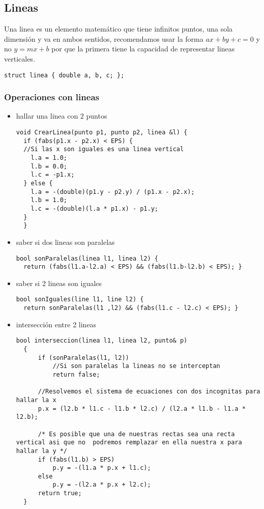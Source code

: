 \subsection{Lineas}
Una linea es un elemento matemático que tiene infinitos puntos, una sola dimensión y va en ambos sentidos, recomendamos usar
la forma $ax+by+c=0$ y no $y=mx+b$ por que la primera tiene la capacidad de representar lineas verticales.
\begin{lstlisting}[style=C]
struct linea { double a, b, c; };
\end{lstlisting}
\subsubsection{Operaciones con lineas}
\begin{itemize}
  \item hallar una linea con 2 puntos
  \\
  \begin{lstlisting}[style=C]
  void CrearLinea(punto p1, punto p2, linea &l) {
  if (fabs(p1.x - p2.x) < EPS) {
  //Si las x son iguales es una linea vertical
    l.a = 1.0;
    l.b = 0.0;
    l.c = -p1.x;
  } else {
    l.a = -(double)(p1.y - p2.y) / (p1.x - p2.x);
    l.b = 1.0;
    l.c = -(double)(l.a * p1.x) - p1.y;
  }
  }
  \end{lstlisting}
  \item saber si dos lineas son paralelas
  \\
  \begin{lstlisting}[style=C]
  bool sonParalelas(linea l1, linea l2) {
  return (fabs(l1.a-l2.a) < EPS) && (fabs(l1.b-l2.b) < EPS); }
  \end{lstlisting}
  \item saber si 2 lineas son iguales
  \\
  \begin{lstlisting}[style=C]
  bool sonIguales(line l1, line l2) {
  return sonParalelas(l1 ,l2) && (fabs(l1.c - l2.c) < EPS); }
  \end{lstlisting}
  \item intersección entre 2 lineas
  \\
  \begin{lstlisting}[style=C]
  bool interseccion(linea l1, linea l2, punto& p)
  {
      if (sonParalelas(l1, l2))
          //Si son paralelas la lineas no se interceptan
          return false;

      //Resolvemos el sistema de ecuaciones con dos incognitas para hallar la x
      p.x = (l2.b * l1.c - l1.b * l2.c) / (l2.a * l1.b - l1.a * l2.b);

      /* Es posible que una de nuestras rectas sea una recta vertical asi que no  podremos remplazar en ella nuestra x para hallar la y */
      if (fabs(l1.b) > EPS)
          p.y = -(l1.a * p.x + l1.c);
      else
          p.y = -(l2.a * p.x + l2.c);
      return true;
  }
  \end{lstlisting}
\end{itemize}
